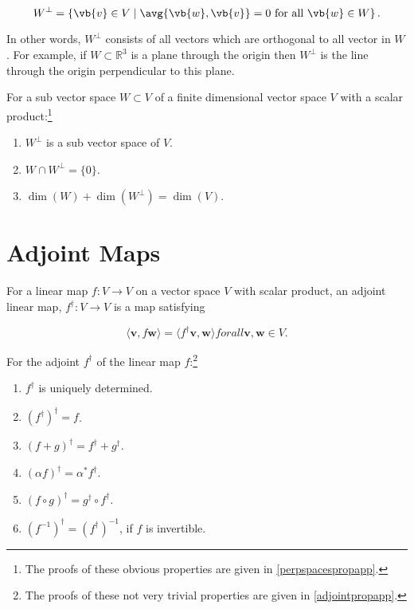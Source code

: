 \documentclass[a4paper,12pt]{report}
\begin{document}
\begin{equation}
    W^{\perp } = \left\{\vb{v} \in V \mid \avg{\vb{w} ,\vb{v} }= 0 \text{ for all } \vb{w} \in W \right\}.
\end{equation}

In other words, \(W^{\perp } \) consists of all vectors which are orthogonal to all vector in \(W\). For example, if \(W \subset \mathbb{R}^3 \) is a plane through the origin then \(W^{\perp } \)  is the line through the origin perpendicular to this plane.   

\begin{lemma} \label{perpspacesprop} 

For a sub vector space \(W \subset V\) of a finite dimensional vector space \(V\) with a scalar product:\footnote{The proofs of these obvious properties are given in \cref{perpspacespropapp}.} 
\begin{enumerate}[label=(\(L\)\arabic*)]
    \item \(W^\perp\) is a sub vector space of \(V\).
    \item \(W \cap W^\perp = \{0\}\).
    \item \(\dim(W) + \dim(W^\perp) = \dim(V)\).
\end{enumerate}
\end{lemma}

\section{Adjoint Maps}

\begin{definition}
For a linear map \(f : V \to V\) on a vector space \(V\) with scalar product, an adjoint linear map, \(f^\dagger : V \to V\) is a map satisfying
    
    \begin{equation}
    \langle \mathbf{v}, f \mathbf{w} \rangle = \langle f^\dagger \mathbf{v}, \mathbf{w} \rangle for all \mathbf{v}, \mathbf{w} \in V.
    \end{equation}

\end{definition}
    
\begin{lemma} \label{adjointprop} 
    For the adjoint \(f^{\dagger} \) of the linear map \(f\):\footnote{The proofs of these not very trivial properties are given in \cref{adjointpropapp}.} 
    \begin{enumerate}[label=(\(M\)\arabic*)]
        \item \(f^\dagger\) is uniquely determined.
        \item \((f^\dagger)^\dagger = f\).
        \item \((f+g)^\dagger = f^\dagger + g^\dagger\).
        \item \((\alpha f)^\dagger = \alpha^* f^\dagger\).
        \item \((f \circ g)^\dagger = g^\dagger \circ f^\dagger\).
        \item \((f^{-1})^\dagger = (f^\dagger)^{-1}\), if \(f\) is invertible.
    \end{enumerate}
\end{lemma}
\end{document}
